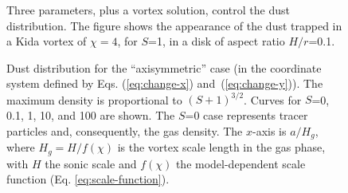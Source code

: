 \documentclass[apj]{emulateapj}
\newcommand{\Eqs}[2]{Eqs. (\ref{#1}) and~(\ref{#2})}
\newcommand{\eqs}[2]{\Eqs{#1}{#2}}
\newcommand{\eqp}[1]{(Eq. \ref{#1})}
\begin{document}
\begin{figure}
\begin{center}
 \end{center}
\caption[]{Three parameters, plus a vortex solution, control the dust distribution. 
The figure shows the appearance of the dust trapped in a Kida vortex of $\chi=4$, 
for $S$=1, in a disk of aspect ratio $H/r$=0.1.} 
 \label{fig:disk}
\end{figure}

\begin{figure}
  \begin{center}
  \end{center}
\caption[]{Dust distribution for the ``axisymmetric'' case (in
    the coordinate system defined by \eqs{eq:change-x}{eq:change-y}). The
    maximum density is proportional to $(S+1)^{3/2}$. Curves for
  $S$=0, 0.1, 1, 10, and 100 are shown. The
  $S$=0 case represents tracer particles and, consequently, the gas
  density. The $x$-axis is $a/H_g$, where $H_g=H/f(\chi)$ is the
  vortex scale length in the gas phase, with $H$ the sonic scale and
  $f(\chi)$ the model-dependent scale function
  \eqp{eq:scale-function}.}
 \label{fig:gaussian}
\end{figure}
\end{document}
